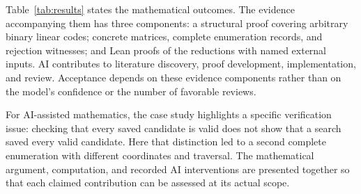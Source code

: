 Table~\ref{tab:results} states the mathematical outcomes. The evidence accompanying them has three components: a structural proof covering arbitrary binary linear codes; concrete matrices, complete enumeration records, and rejection witnesses; and Lean proofs of the reductions with named external inputs. AI contributes to literature discovery, proof development, implementation, and review. Acceptance depends on these evidence components rather than on the model's confidence or the number of favorable reviews.

For AI-assisted mathematics, the case study highlights a specific verification issue: checking that every saved candidate is valid does not show that a search saved every valid candidate. Here that distinction led to a second complete enumeration with different coordinates and traversal. The mathematical argument, computation, and recorded AI interventions are presented together so that each claimed contribution can be assessed at its actual scope.

